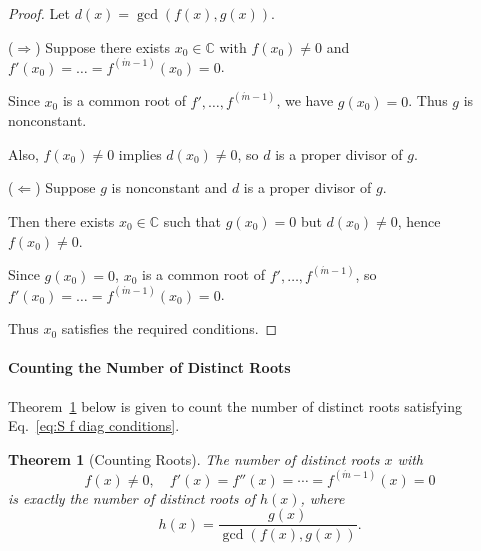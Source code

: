 \documentclass[11pt]{article}
\newtheorem{theorem}{Theorem}
\begin{document}
\begin{proof}
Let $d(x) = \gcd(f(x), g(x))$.

($\Rightarrow$) Suppose there exists $x_0 \in \mathbb{C}$ with $f(x_0) \neq 0$ and $f'(x_0) = \dots = f^{(\acute{m}-1)}(x_0) = 0$. 

Since $x_0$ is a common root of $f', \dots, f^{(\acute{m}-1)}$, we have $g(x_0) = 0$. Thus $g$ is nonconstant. 

Also, $f(x_0) \neq 0$ implies $d(x_0) \neq 0$, so $d$ is a proper divisor of $g$.

($\Leftarrow$) Suppose $g$ is nonconstant and $d$ is a proper divisor of $g$. 

Then there exists $x_0 \in \mathbb{C}$ such that $g(x_0) = 0$ but $d(x_0) \neq 0$, hence $f(x_0) \neq 0$.

Since $g(x_0) = 0$, $x_0$ is a common root of $f', \dots, f^{(\acute{m}-1)}$, so $f'(x_0) = \dots = f^{(\acute{m}-1)}(x_0) = 0$.

Thus $x_0$ satisfies the required conditions.
\end{proof}

\paragraph{Counting the Number of Distinct Roots}

Theorem~\ref{thm:S Counting distinct roots} below is given to count the number of distinct roots satisfying Eq.~\eqref{eq:S f diag conditions}. 

\begin{theorem}[Counting Roots]\label{thm:S Counting distinct roots}
The number of distinct roots \( x \) with
\[
f(x)\neq 0, 
\quad f'(x)=f''(x)=\cdots=f^{(\acute{m}-1)}(x)=0
\]
is exactly the number of distinct roots of \( h(x) \), where 
\[
h(x) = \frac{g(x)}{\gcd(f(x), g(x))}.
\]
\end{theorem}
\end{document}
